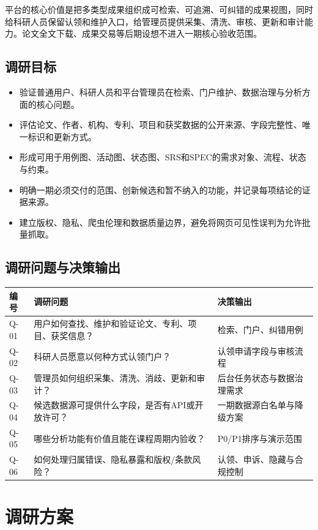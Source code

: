 \documentclass[UTF8,11pt,a4paper]{ctexart}
\begin{document}
平台的核心价值是把多类型成果组织成可检索、可追溯、可纠错的成果视图，同时给科研人员保留认领和维护入口，给管理员提供采集、清洗、审核、更新和审计能力。论文全文下载、成果交易等后期设想不进入一期核心验收范围。

\subsection{调研目标}
\begin{itemize}
\item 验证普通用户、科研人员和平台管理员在检索、门户维护、数据治理与分析方面的核心问题。
\item 评估论文、作者、机构、专利、项目和获奖数据的公开来源、字段完整性、唯一标识和更新方式。
\item 形成可用于用例图、活动图、状态图、SRS和SPEC的需求对象、流程、状态与约束。
\item 明确一期必须交付的范围、创新候选和暂不纳入的功能，并记录每项结论的证据来源。
\item 建立版权、隐私、爬虫伦理和数据质量边界，避免将网页可见性误判为允许批量抓取。
\end{itemize}

\subsection{调研问题与决策输出}
\begin{longtable}{p{1.2cm}p{8.0cm}p{5.0cm}}
\toprule 编号 & 调研问题 & 决策输出\\\midrule
Q-01 & 用户如何查找、维护和验证论文、专利、项目、获奖信息？ & 检索、门户、纠错用例\\
Q-02 & 科研人员愿意以何种方式认领门户？ & 认领申请字段与审核流程\\
Q-03 & 管理员如何组织采集、清洗、消歧、更新和审计？ & 后台任务状态与数据治理需求\\
Q-04 & 候选数据源可提供什么字段，是否有API或开放许可？ & 一期数据源白名单与降级方案\\
Q-05 & 哪些分析功能有价值且能在课程周期内验收？ & P0/P1排序与演示范围\\
Q-06 & 如何处理归属错误、隐私暴露和版权/条款风险？ & 认领、申诉、隐藏与合规控制\\\bottomrule
\end{longtable}

\section{调研方案}
\end{document}
